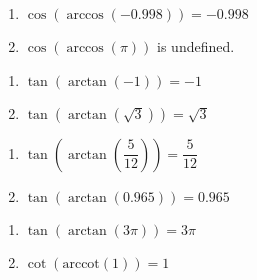\documentclass{ximera}
\begin{document}
\begin{multicols}{2}

\begin{enumerate}

\setcounter{enumi}{\value{HW}}

\item $\cos\left(\arccos\left(-0.998\right)\right) = -0.998$
\item $\cos\left(\arccos\left(\pi \right)\right)$ is undefined.

\setcounter{HW}{\value{enumi}}

\end{enumerate}

\end{multicols}

\begin{multicols}{2}

\begin{enumerate}

\setcounter{enumi}{\value{HW}}

\item $\tan\left(\arctan\left(-1\right)\right) = -1$
\item $\tan\left(\arctan\left(\sqrt{3}\right)\right) = \sqrt{3}$

\setcounter{HW}{\value{enumi}}

\end{enumerate}

\end{multicols}

\begin{multicols}{2}

\begin{enumerate}

\setcounter{enumi}{\value{HW}}

\item $\tan\left(\arctan\left(\dfrac{5}{12}\right)\right) = \dfrac{5}{12}$
\item $\tan\left(\arctan\left(0.965\right)\right) = 0.965$ 

\setcounter{HW}{\value{enumi}}

\end{enumerate}

\end{multicols}

\begin{multicols}{2}

\begin{enumerate}

\setcounter{enumi}{\value{HW}}

\item $\tan\left(\arctan\left( 3\pi \right)\right) = 3\pi$
\item $\cot\left(\text{arccot}\left(1\right)\right) = 1$

\setcounter{HW}{\value{enumi}}

\end{enumerate}

\end{multicols}
\end{document}
